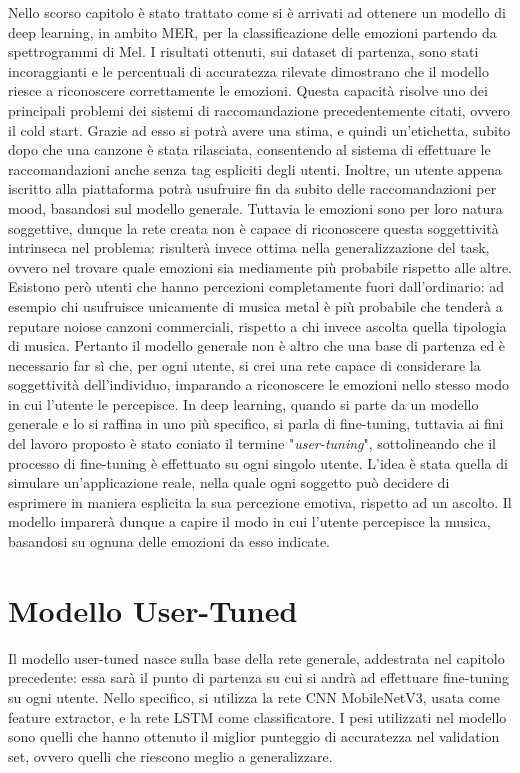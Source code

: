 \documentclass[11pt]{report}
\begin{document}
Nello scorso capitolo è stato trattato come si è arrivati ad ottenere un modello di deep learning, in ambito MER, per la classificazione delle emozioni partendo da spettrogrammi di Mel. I risultati ottenuti, sui dataset di partenza, sono stati incoraggianti e le percentuali di accuratezza rilevate dimostrano che il modello riesce a riconoscere correttamente le emozioni. Questa capacità risolve uno dei principali problemi dei sistemi di raccomandazione precedentemente citati, ovvero il cold start. Grazie ad esso si potrà avere una stima, e quindi un'etichetta, subito dopo che una canzone è stata rilasciata, consentendo al sistema di effettuare le raccomandazioni anche senza tag espliciti degli utenti. Inoltre, un utente appena iscritto alla piattaforma potrà usufruire fin da subito delle raccomandazioni per mood, basandosi sul modello generale. Tuttavia le emozioni sono per loro natura soggettive, dunque la rete creata non è capace di riconoscere questa soggettività intrinseca nel problema: risulterà invece ottima nella generalizzazione del task, ovvero nel trovare quale emozioni sia mediamente più probabile rispetto alle altre. Esistono però utenti che hanno percezioni completamente fuori dall'ordinario: ad esempio chi usufruisce unicamente di musica metal è più probabile che tenderà a reputare noiose canzoni commerciali, rispetto a chi invece ascolta quella tipologia di musica. Pertanto il modello generale non è altro che una base di partenza ed è necessario far sì che, per ogni utente, si crei una rete capace di considerare la soggettività dell'individuo, imparando a riconoscere le emozioni nello stesso modo in cui l'utente le percepisce. In deep learning, quando si parte da un modello generale e lo si raffina in uno più specifico, si parla di fine-tuning, tuttavia ai fini del lavoro proposto è stato coniato il termine "\textit{user-tuning}", sottolineando che il processo di fine-tuning è effettuato su ogni singolo utente. L'idea è stata quella di simulare un'applicazione reale, nella quale ogni soggetto può decidere di esprimere in maniera esplicita la sua percezione emotiva, rispetto ad un ascolto. Il modello imparerà dunque a capire il modo in cui l'utente percepisce la musica, basandosi su ognuna delle emozioni da esso indicate. 

\newpage


\section{Modello User-Tuned}


Il modello user-tuned nasce sulla base della rete generale, addestrata nel capitolo precedente: essa sarà il punto di partenza su cui si andrà ad effettuare fine-tuning su ogni utente. Nello specifico, si utilizza la rete CNN MobileNetV3, usata come feature extractor, e la rete LSTM come classificatore. I pesi utilizzati nel modello sono quelli che hanno ottenuto il miglior punteggio di accuratezza nel validation set, ovvero quelli che riescono meglio a generalizzare.
\end{document}

